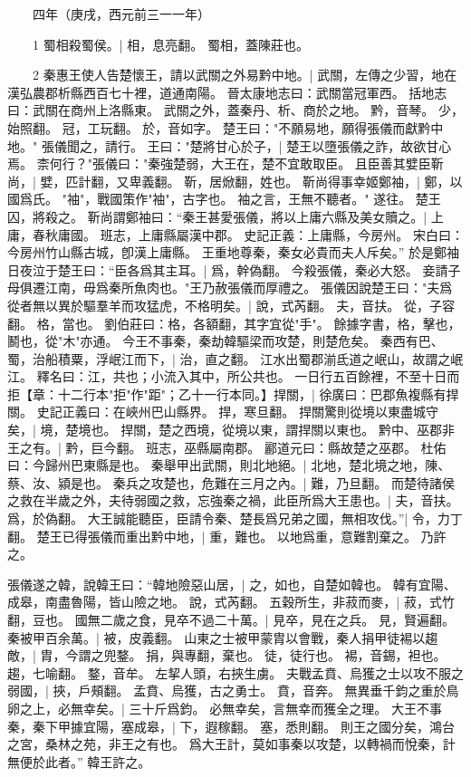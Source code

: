 　　四年（庚戌，西元前三一一年）

　　1 蜀相殺蜀侯。|{
	相，息亮翻。
	蜀相，蓋陳莊也。
}

　　2 秦惠王使人告楚懷王，請以武關之外易黔中地。|{
	武關，左傳之少習，地在漢弘農郡析縣西百七十裡，道通南陽。
	晉太康地志曰：武關當冠軍西。
	括地志曰：武關在商州上洛縣東。
	武關之外，蓋秦丹、析、商於之地。
	黔，音琴。
	少，始照翻。
	冠，工玩翻。
	於，音如字。
}
楚王曰："不願易地，願得張儀而獻黔中地。"
張儀聞之，請行。
王曰："楚將甘心於子，|{
	楚王以墮張儀之詐，故欲甘心焉。
}
柰何行？"張儀曰："秦強楚弱，大王在，楚不宜敢取臣。
	且臣善其嬖臣靳尚，|{
	嬖，匹計翻，又卑義翻。
	靳，居焮翻，姓也。
}
靳尚得事幸姬鄭袖，|{
	鄭，以國爲氏。
	"袖"，戰國策作"袖"，古字也。
}
袖之言，王無不聽者。"
遂往。
楚王囚，將殺之。
靳尚謂鄭袖曰：“秦王甚愛張儀，將以上庸六縣及美女贖之。|{
	上庸，春秋庸國。
	班志，上庸縣屬漢中郡。
	史記正義：上庸縣，今房州。
	宋白曰：今房州竹山縣古城，卽漢上庸縣。
}
王重地尊秦，秦女必貴而夫人斥矣。”
於是鄭袖日夜泣于楚王曰：“臣各爲其主耳。|{
	爲，幹偽翻。
}
今殺張儀，秦必大怒。
	妾請子母俱遷江南，毋爲秦所魚肉也。"王乃赦張儀而厚禮之。
	張儀因說楚王曰："夫爲從者無以異於驅羣羊而攻猛虎，不格明矣。|{
	說，式芮翻。
	夫，音扶。
	從，子容翻。
	格，當也。
	劉伯莊曰：格，各額翻，其字宜從"手"。
	餘據字書，格，擊也，鬭也，從"木"亦通。
}
今王不事秦，秦劫韓驅梁而攻楚，則楚危矣。
秦西有巴、蜀，治船積粟，浮岷江而下，|{
	治，直之翻。
	江水出蜀郡湔氐道之岷山，故謂之岷江。
	釋名曰：江，共也；小流入其中，所公共也。
}
一日行五百餘裡，不至十日而拒【章：十二行本"拒"作"距"；乙十一行本同。】捍關，|{
	徐廣曰：巴郡魚複縣有捍關。
	史記正義曰：在峽州巴山縣界。
	捍，寒旦翻。
}
捍關驚則從境以東盡城守矣，|{
	境，楚境也。
	捍關，楚之西境，從境以東，謂捍關以東也。
}
黔中、巫郡非王之有。|{
	黔，巨今翻。
	班志，巫縣屬南郡。
	酈道元曰：縣故楚之巫郡。
	杜佑曰：今歸州巴東縣是也。
}
秦舉甲出武關，則北地絕。|{
	北地，楚北境之地，陳、蔡、汝、潁是也。
}
秦兵之攻楚也，危難在三月之內。|{
	難，乃旦翻。
}
而楚待諸侯之救在半歲之外，夫待弱國之救，忘強秦之禍，此臣所爲大王患也。|{
	夫，音扶。
	爲，於偽翻。
}
大王誠能聽臣，臣請令秦、楚長爲兄弟之國，無相攻伐。”|{
	令，力丁翻。
}
楚王已得張儀而重出黔中地，|{
	重，難也。
	以地爲重，意難割棄之。
}
乃許之。


張儀遂之韓，說韓王曰：“韓地險惡山居，|{
	之，如也，自楚如韓也。
	韓有宜陽、成皋，南盡魯陽，皆山險之地。
	說，式芮翻。
}
五穀所生，非菽而麥，|{
	菽，式竹翻，豆也。
}
國無二歲之食，見卒不過二十萬。|{
	見卒，見在之兵。
	見，賢遍翻。
}
秦被甲百余萬。|{
	被，皮義翻。
}
山東之士被甲蒙胄以會戰，秦人捐甲徒裼以趨敵，|{
	胄，今謂之兜鍪。
	捐，與專翻，棄也。
	徒，徒行也。
	裼，音錫，袒也。
	趨，七喻翻。
	鍪，音牟。
}
左挈人頭，右挾生虜。
	夫戰孟賁、烏獲之士以攻不服之弱國，|{
	挾，戶頰翻。
	孟賁、烏獲，古之勇士。
	賁，音奔。
}
無異垂千鈞之重於鳥卵之上，必無幸矣。|{
	三十斤爲鈞。
	必無幸矣，言無幸而獲全之理。
}
大王不事秦，秦下甲據宜陽，塞成皋，|{
	下，遐稼翻。
	塞，悉則翻。
}
則王之國分矣，鴻台之宮，桑林之苑，非王之有也。
爲大王計，莫如事秦以攻楚，以轉禍而悅秦，計無便於此者。”
韓王許之。


